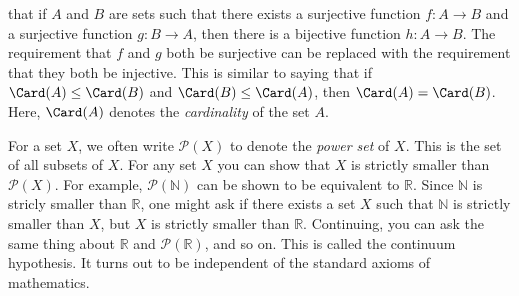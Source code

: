         that if $A$ and $B$ are sets such that there exists
        a surjective function $f:A\rightarrow{B}$ and a
        surjective function $g:B\rightarrow{A}$, then there
        is a bijective function $h:A\rightarrow{B}$. The
        requirement that $f$ and $g$ both be surjective
        can be replaced with the requirement that they both
        be injective. This is similar to saying that if
        $\Card(A)\leq\Card(B)$ and $\Card(B)\leq\Card(A)$,
        then $\Card(A)=\Card(B)$. Here, $\Card(A)$ denotes
        the \textit{cardinality} of the set $A$.
        \par\hfill\par
        \vspace{-2ex}
        For a set $X$, we often write $\mathcal{P}(X)$ to denote the
        \textit{power set} of $X$. This is the set of all subsets of $X$.
        For any set $X$ you can show that $X$ is strictly smaller than
        $\mathcal{P}(X)$. For example, $\mathcal{P}(\mathbb{N})$ can be shown
        to be equivalent to $\mathbb{R}$. Since $\mathbb{N}$ is stricly
        smaller than $\mathbb{R}$, one might ask if there exists a set $X$
        such that $\mathbb{N}$ is strictly smaller than $X$, but $X$ is
        strictly smaller than $\mathbb{R}$. Continuing, you can ask the same
        thing about $\mathbb{R}$ and $\mathcal{P}(\mathbb{R})$, and so on.
        This is called the continuum hypothesis. It turns out to be independent
        of the standard axioms of mathematics.
